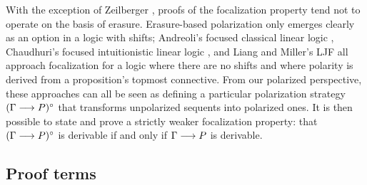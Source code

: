 \documentclass[acmtocl]{robtrans}\pdfoutput=1
\newcommand{\seq}[2]{{#1} \longrightarrow {#2} \mathstrut}
\begin{document}
With the exception of Zeilberger , proofs
of the focalization property tend not to operate on the basis of
erasure. Erasure-based polarization only emerges clearly as an option
in a logic with shifts; Andreoli's focused classical linear logic
, Chaudhuri's focused intuitionistic linear
logic , and Liang and Miller's LJF
 all approach focalization for a logic
where there are no shifts and where polarity is derived from a
proposition's topmost connective.  From our polarized perspective,
these approaches can all be seen as defining a particular polarization
strategy $(\seq{\Gamma}{P})^\circ$ that transforms unpolarized
sequents into polarized ones. It is then possible to state and prove a
strictly weaker focalization property: that $(\seq{\Gamma}{P})^\circ$
is derivable if and only if $\seq{\Gamma}{P}$ is derivable.


\subsection{Proof terms}\label{sec:proofterms}
\end{document}
